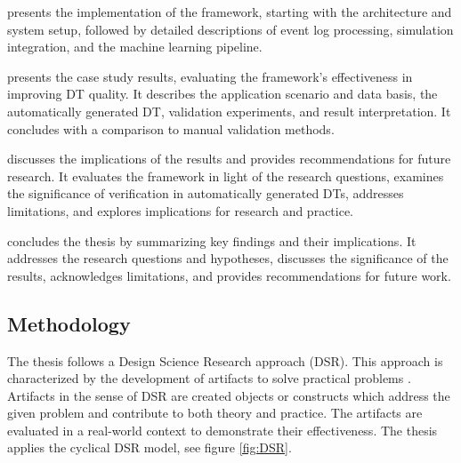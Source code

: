 presents the implementation of the framework, starting with the architecture and system setup, followed by detailed descriptions of event log processing, simulation integration, and the machine learning pipeline.

 presents the case study results, evaluating the framework's effectiveness in improving DT quality. It describes the application scenario and data basis, the automatically generated DT, validation experiments, and result interpretation. It concludes with a comparison to manual validation methods.

 discusses the implications of the results and provides recommendations for future research. It evaluates the framework in light of the research questions, examines the significance of verification in automatically generated DTs, addresses limitations, and explores implications for research and practice.

 concludes the thesis by summarizing key findings and their implications. It addresses the research questions and hypotheses, discusses the significance of the results, acknowledges limitations, and provides recommendations for future work.

\subsection*{Methodology}

The thesis follows a Design Science Research approach (DSR). This approach is characterized by the development of artifacts to solve practical problems \parencite{hevner2004design,peffers2007design}. Artifacts in the sense of DSR are created objects or constructs which address the given problem and contribute to both theory and practice. The artifacts are evaluated in a real-world context to demonstrate their effectiveness. The thesis applies the cyclical DSR model, see figure \ref{fig:DSR}.


